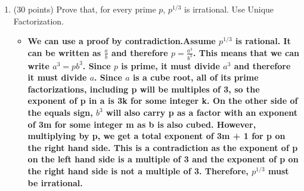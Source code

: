 \documentclass[12pt]{article}
\begin{document}
\begin{enumerate}
\begin{enumerate}
\begin{itemize}
    \item \textbf{Let's use a proof by contradiction and assume that $101^{1/4}$ is rational. Then we can write $101^{1/4}$ as $\frac ab$ where a and b are both integers with no factors in common. This means that $101 = \frac {a^4}{b^4}$ and therefore, $a^4 = 101b^4$. Since $a^4$ is divisible by 101, $a$ is also divisible by 101, meaning that $a$ can be written as $101k$ for some integer k. Since $a$ is a fourth root, all of its prime factorizations, including 101 will be multiples of 4, so the exponent of 101 in a is 4k for some integer k. On the other side of the equals sign, $b^4$ will also carry 101 as a factor with an exponent of 4m for some integer m as b is also fourth powered. However, multiplying by 101, we get a total exponent of 4m + 1 for 101 on the right hand side. This is a contradiction as the exponent of 101 on the left hand side is a multiple of 4 and the exponent of 101 on the right hand side is not a multiple of 4. Therefore, $101^{1/4}$ must be irrational.}
\end{itemize}
\item
(0 points, don't hand anything in) 
Would the proof that $101^{1/4}$ have been longer or shorter if you
did it WITHOUT USING unique factorization.
\end{enumerate}

\vfill

\centerline{\bf GO TO NEXT PAGE}

\newpage

\item 
(30 points) Prove that, for every prime $p$, $p^{1/3}$ is irrational.
Use Unique Factorization.
\begin{itemize}
    \item \textbf{We can use a proof by contradiction.Assume $p^{1/3}$ is rational. It can be written as $\frac ab$ and therefore $p = \frac{a^3}{b^3}$. This means that we can write $a^3 = pb^3$. Since $p$ is prime, it must divide $a^3$ and therefore it must divide $a$. Since $a$ is a cube root, all of its prime factorizations, including p will be multiples of 3, so the exponent of p in a is 3k for some integer k. On the other side of the equals sign, $b^3$ will also carry p as a factor with an exponent of 3m for some integer m as b is also cubed. However, multiplying by p, we get a total exponent of 3m + 1 for p on the right hand side. This is a contradiction as the exponent of p on the left hand side is a multiple of 3 and the exponent of p on the right hand side is not a multiple of 3. Therefore, $p^{1/3}$ must be irrational.}
\end{itemize}
\end{enumerate}
\end{document}
